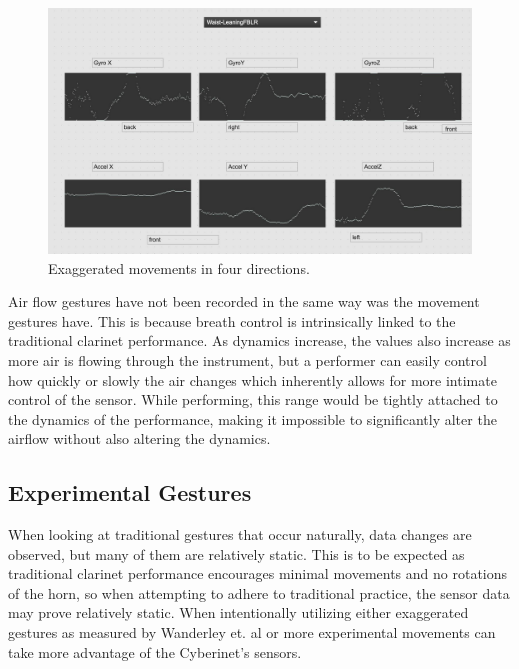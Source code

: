 \begin{figure}
    \centering
    \includegraphics[scale=0.2]{diagrams/gestureData/waistLeaning.png}
    \caption{Exaggerated movements in four directions.}
    \label{fig:exHor}
\end{figure}

Air flow gestures have not been recorded in the same way was the movement gestures have. This is because breath control is intrinsically linked to the traditional clarinet performance. As dynamics increase, the values also increase as more air is flowing through the instrument, but a performer can easily control how quickly or slowly the air changes which inherently allows for more intimate control of the sensor. While performing, this range would be tightly attached to the dynamics of the performance, making it impossible to significantly alter the airflow without also altering the dynamics.


\subsection{Experimental Gestures}
 When looking at traditional gestures that occur naturally\cite{wanderleyClarinetGesture2005}, data changes are observed, but many of them are relatively static. This is to be expected as traditional clarinet performance encourages minimal movements and no rotations of the horn, so when attempting to adhere to traditional practice, the sensor data may prove relatively static. When intentionally utilizing either exaggerated gestures as measured by Wanderley et. al or more experimental movements can take more advantage of the Cyberinet's sensors.

